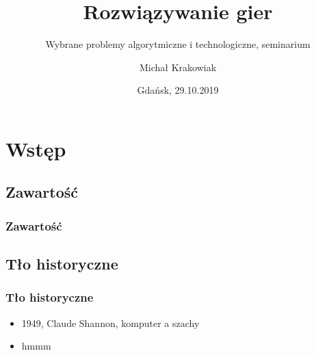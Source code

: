 \documentclass[polish,envcountsect,10pt]{beamer}
\title{Rozwiązywanie gier}
\author{Michał Krakowiak}
\subtitle{Wybrane problemy algorytmiczne i technologiczne, seminarium}
\date{Gdańsk, 29.10.2019}
\begin{document}
    \frame{\titlepage}
    \section{Wstęp}
        \subsection{Zawartość}
            \begin{frame}
                \frametitle{Zawartość}
                \begin{multicols}{2}
                    \tableofcontents[pausesections]                    
                \end{multicols}
            \end{frame}
        \subsection{Tło historyczne}
            \begin{frame}
                \frametitle{Tło historyczne}
                \begin{itemize}
                    \item<1-> 1949, Claude Shannon, komputer a szachy
                    \item<2-> hmmm
                \end{itemize}
            \end{frame}
\end{document}
